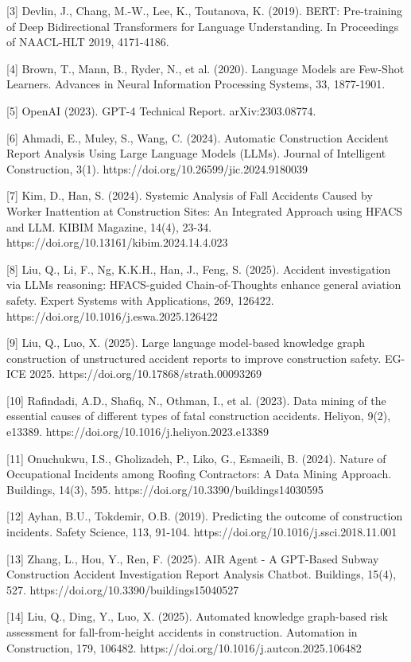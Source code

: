\documentclass[11pt]{article}
\begin{document}
[3] Devlin, J., Chang, M.-W., Lee, K., Toutanova, K. (2019). BERT: Pre-training of Deep Bidirectional Transformers for Language Understanding. In Proceedings of NAACL-HLT 2019, 4171-4186.

[4] Brown, T., Mann, B., Ryder, N., et al. (2020). Language Models are Few-Shot Learners. Advances in Neural Information Processing Systems, 33, 1877-1901.

[5] OpenAI (2023). GPT-4 Technical Report. arXiv:2303.08774.

[6] Ahmadi, E., Muley, S., Wang, C. (2024). Automatic Construction Accident Report Analysis Using Large Language Models (LLMs). Journal of Intelligent Construction, 3(1). https://doi.org/10.26599/jic.2024.9180039

[7] Kim, D., Han, S. (2024). Systemic Analysis of Fall Accidents Caused by Worker Inattention at Construction Sites: An Integrated Approach using HFACS and LLM. KIBIM Magazine, 14(4), 23-34. https://doi.org/10.13161/kibim.2024.14.4.023

[8] Liu, Q., Li, F., Ng, K.K.H., Han, J., Feng, S. (2025). Accident investigation via LLMs reasoning: HFACS-guided Chain-of-Thoughts enhance general aviation safety. Expert Systems with Applications, 269, 126422. https://doi.org/10.1016/j.eswa.2025.126422

[9] Liu, Q., Luo, X. (2025). Large language model-based knowledge graph construction of unstructured accident reports to improve construction safety. EG-ICE 2025. https://doi.org/10.17868/strath.00093269

[10] Rafindadi, A.D., Shafiq, N., Othman, I., et al. (2023). Data mining of the essential causes of different types of fatal construction accidents. Heliyon, 9(2), e13389. https://doi.org/10.1016/j.heliyon.2023.e13389

[11] Onuchukwu, I.S., Gholizadeh, P., Liko, G., Esmaeili, B. (2024). Nature of Occupational Incidents among Roofing Contractors: A Data Mining Approach. Buildings, 14(3), 595. https://doi.org/10.3390/buildings14030595

[12] Ayhan, B.U., Tokdemir, O.B. (2019). Predicting the outcome of construction incidents. Safety Science, 113, 91-104. https://doi.org/10.1016/j.ssci.2018.11.001

[13] Zhang, L., Hou, Y., Ren, F. (2025). AIR Agent - A GPT-Based Subway Construction Accident Investigation Report Analysis Chatbot. Buildings, 15(4), 527. https://doi.org/10.3390/buildings15040527

[14] Liu, Q., Ding, Y., Luo, X. (2025). Automated knowledge graph-based risk assessment for fall-from-height accidents in construction. Automation in Construction, 179, 106482. https://doi.org/10.1016/j.autcon.2025.106482
\end{document}
